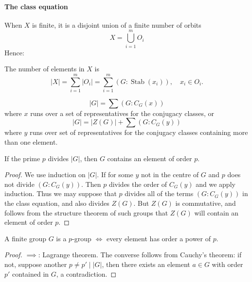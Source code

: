 \paragraph{The class equation}

When \( X \) is finite, it is a disjoint union of a finite number of orbits
\[
  X = \bigcup_{i = 1}^m O_i
\]
Hence:
\begin{proposition}
  The number of elements in \( X \) is
  \[
    \left\vert X \right\vert = \sum_{i = 1}^m \left\vert O_i \right\vert = \sum_{i = 1}^m (G: \operatorname{Stab}(x_i)),\quad x_i \in O_i.
  \]
\end{proposition}

\begin{proposition}
  \[
    \left\vert G \right\vert = \sum (G: C_G(x))
  \]
  where \( x \) runs over a set of representatives for the conjugacy classes, or
  \[
    \left\vert G \right\vert = \left\vert Z(G) \right\vert + \sum(G : C_G(y))
  \]
  where \( y \) runs over set of representatives for the conjugacy classes containing more than one element.
\end{proposition}

\begin{theorem}[Cauchy]
  If the prime \( p \) divides \( \left\vert G \right\vert \), then \( G \) contains an element of order \( p \).
\end{theorem}
\begin{proof}
  We use induction on \( \left\vert G \right\vert \).
  If for some \( y \) not in the centre of \( G \) and \( p \) does not divide \( (G: C_G(y)) \).
  Then \( p \) divides the order of \( C_G(y) \) and we apply induction.
  Thus we may suppose that \( p \) divides all of the terms \( (G: C_G(y)) \) in the class equation, and also divides \( Z(G) \).
  But \( Z(G) \) is commutative, and follows from the structure theorem of such groups that \( Z(G) \) will contain an element of order \( p \).
\end{proof}

\begin{corollary}
  A finite group \( G \) is a \( p \)-group \( \iff \) every element has order a power of \( p \).
\end{corollary}
\begin{proof}
  \( \implies \): Lagrange theorem.
  The converse follows from Cauchy's theorem: if not, suppose another \( p \neq p' \mid \left\vert G \right\vert \), then there exists an element \( a \in G \) with order \( p' \) contained in \( G \), a contradiction.
\end{proof}

